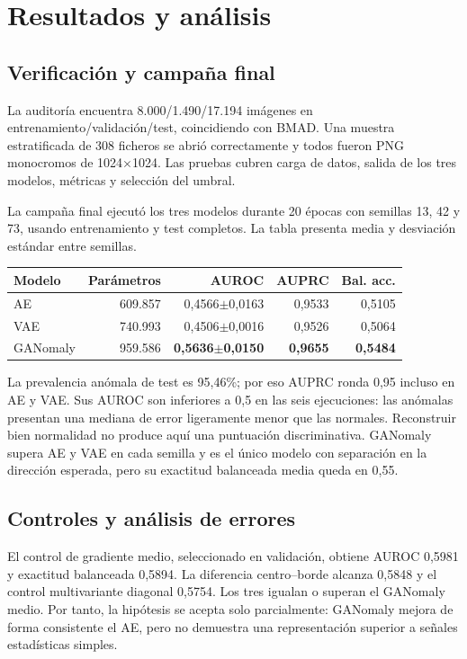 \section{Resultados y análisis}

\subsection{Verificación y campaña final}

La auditoría encuentra 8.000/1.490/17.194 imágenes en
entrenamiento/validación/test, coincidiendo con BMAD. Una muestra estratificada
de 308 ficheros se abrió correctamente y todos fueron PNG monocromos de
1024$\times$1024. Las pruebas cubren carga de datos, salida de los tres modelos,
métricas y selección del umbral.

La campaña final ejecutó los tres modelos durante 20 épocas con semillas 13,
42 y 73, usando entrenamiento y test completos. La tabla presenta media y
desviación estándar entre semillas.

\begin{center}
\small
\begin{tabular}{lrrrr}
\toprule
Modelo & Parámetros & AUROC & AUPRC & Bal. acc. \\
\midrule
AE       & 609.857 & 0,4566$\pm$0,0163 & 0,9533 & 0,5105 \\
VAE      & 740.993 & 0,4506$\pm$0,0016 & 0,9526 & 0,5064 \\
GANomaly & 959.586 & \textbf{0,5636$\pm$0,0150} & \textbf{0,9655} & \textbf{0,5484} \\
\bottomrule
\end{tabular}
\end{center}

La prevalencia anómala de test es 95,46\%; por eso AUPRC ronda 0,95 incluso en
AE y VAE. Sus AUROC son inferiores a 0,5 en las seis ejecuciones: las anómalas
presentan una mediana de error ligeramente menor que las normales. Reconstruir
bien normalidad no produce aquí una puntuación discriminativa. GANomaly supera
AE y VAE en cada semilla y es el único modelo con separación en la dirección
esperada, pero su exactitud balanceada media queda en 0,55.

\subsection{Controles y análisis de errores}

El control de gradiente medio, seleccionado en validación, obtiene AUROC 0,5981
y exactitud balanceada 0,5894. La diferencia centro--borde alcanza 0,5848 y el
control multivariante diagonal 0,5754. Los tres igualan o superan el GANomaly
medio. Por tanto, la hipótesis se acepta solo parcialmente: GANomaly mejora de
forma consistente el AE, pero no demuestra una representación superior a
señales estadísticas simples.


